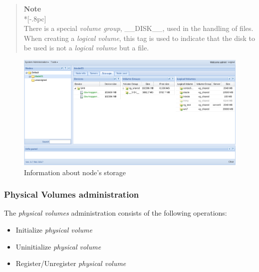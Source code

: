 \begin{quote}
	{\large \bf Note} \\*[-.8pc]
	\underline{\hspace{6in}} \\
There is a special \emph{volume group}, \_\_DISK\_\_, used in the handling of files. When creating a \emph{logical volume}, this tag is used to indicate that the disk to be used is not a \emph{logical volume} but a file.
\end{quote}


\begin{figure}[H]
	\begin{center}
	\includegraphics[scale=0.45]{screenshots/node_storage.png}
	\caption{Information about node's storage}
	\label{fig:inicial}
	\end{center}
\end{figure}


\subsubsection{Physical Volumes administration}
The \emph{physical volumes} administration consists of the following operations:
\begin{itemize}
	\item Initialize \emph{physical volume}
    \item Uninitialize \emph{physical volume}
    \item Register/Unregister \emph{physical volume}
\end{itemize}

